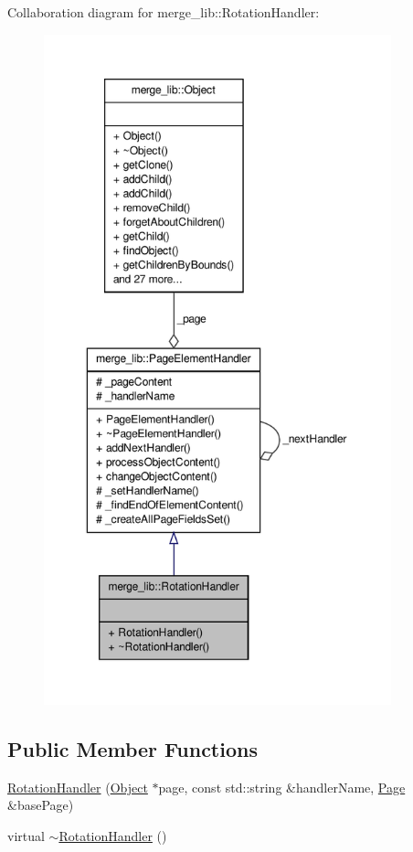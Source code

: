 Collaboration diagram for merge\-\_\-lib\-:\-:Rotation\-Handler\-:
\nopagebreak
\begin{figure}[H]
\begin{center}
\leavevmode
\includegraphics[height=550pt]{db/dbe/classmerge__lib_1_1_rotation_handler__coll__graph}
\end{center}
\end{figure}
\subsection*{Public Member Functions}
\begin{DoxyCompactItemize}
\item 
\hyperlink{classmerge__lib_1_1_rotation_handler_a87ab70ad73fed0d4dc86966c5bec4169}{Rotation\-Handler} (\hyperlink{classmerge__lib_1_1_object}{Object} $\ast$page, const std\-::string \&handler\-Name, \hyperlink{classmerge__lib_1_1_page}{Page} \&base\-Page)
\item 
virtual \hyperlink{classmerge__lib_1_1_rotation_handler_aebb0d163821f1d1cb9a10cc9c44c7612}{$\sim$\-Rotation\-Handler} ()
\end{DoxyCompactItemize}
